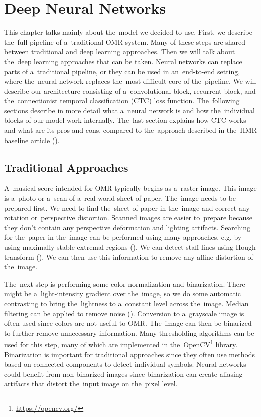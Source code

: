 \chapter{Deep Neural Networks}
\label{chap:DeepNeuralNetwork}

This chapter talks mainly about the~model we decided to use. First, we describe the~full pipeline of a~traditional OMR system. Many of these steps are shared between traditional and deep learning approaches. Then we will talk about the~deep learning approaches that can be taken. Neural networks can replace parts of a~traditional pipeline, or they can be used in an~end-to-end setting, where the~neural network replaces the~most difficult core of the~pipeline. We will describe our architecture consisting of a~convolutional block, recurrent block, and the~connectionist temporal classification (CTC) loss function. The~following sections describe in more detail what a~neural network is and how the~individual blocks of our model work internally. The~last section explains how CTC works and what are its pros and cons, compared to the~approach described in the~HMR baseline article (\cite{HmrBaseline}).


\section{Traditional Approaches}

A~musical score intended for OMR typically begins as a~raster image. This image is a~photo or a~scan of a~real-world sheet of paper. The~image needs to be prepared first. We need to find the~sheet of paper in the~image and correct any rotation or~perspective distortion. Scanned images are easier to~prepare because they don't contain any perspective deformation and lighting artifacts. Searching for the~paper in the~image can be performed using many approaches, e.g. by using maximally stable extremal regions (\cite{MSER}). We can detect staff lines using Hough transform (\cite{Hough}). We can then use this information to remove any affine distortion of the~image.

The~next step is performing some color normalization and binarization. There might be a~light-intensity gradient over the~image, so we do some automatic contrasting to bring the~lightness to a~constant level across the~image. Median filtering can be applied to remove noise (\cite{MedianFiltering}). Conversion to a~grayscale image is often used since colors are not useful to OMR. The~image can then be binarized to further remove unnecessary information. Many thresholding algorithms can be used for this step, many of which are implemented in the~OpenCV\footnote{\href{https://opencv.org/}{https://opencv.org/}} library. Binarization is important for traditional approaches since they often use methods based on connected components to detect individual symbols. Neural networks could benefit from non-binarized images since binarization can create aliasing artifacts that distort the~input image on the~pixel level.

